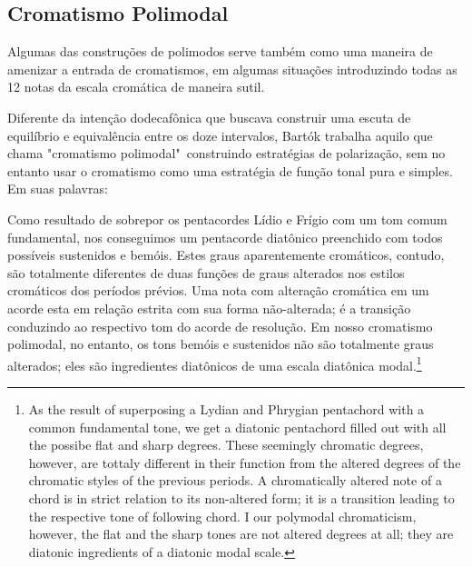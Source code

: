 \documentclass[
	12pt,				%
	openright,			%
	twoside,			%
	a4paper,			%
	english,			%
	french,				%
	spanish,			%
	brazil				%
	]{abntex2}
\begin{document}
\subsection{Cromatismo Polimodal}
\label{polimodal}

Algumas das construções de polimodos serve também como uma maneira de amenizar a entrada de cromatismos, em algumas situações introduzindo todas as 12 notas da escala cromática de maneira sutil. 

Diferente da intenção dodecafônica que buscava construir uma escuta de equilíbrio e equivalência entre os doze intervalos, Bartók trabalha aquilo que chama "cromatismo polimodal"\ construindo estratégias de polarização, sem no entanto usar o cromatismo como uma estratégia de função tonal pura e simples. Em suas palavras:

\begin{citacao}
Como resultado de sobrepor os pentacordes Lídio e Frígio com um tom comum fundamental, nos conseguimos um pentacorde diatônico preenchido com todos possíveis sustenidos e bemóis. Estes graus aparentemente cromáticos, contudo, são totalmente diferentes de duas funções de graus alterados nos estilos cromáticos dos períodos prévios. Uma nota com alteração cromática em um acorde esta em relação estrita com sua forma não-alterada; é a transição conduzindo ao respectivo tom do acorde de resolução. Em nosso cromatismo polimodal, no entanto, os tons bemóis e sustenidos não são totalmente graus alterados; eles são ingredientes diatônicos de uma escala diatônica modal.\cite[ p.367]{bartok1993bela}\footnote{As the result of superposing a Lydian and Phrygian pentachord with a common fundamental tone, we get a diatonic pentachord filled out with all the possibe flat and sharp degrees. These seemingly chromatic degrees, however, are tottaly different in their function from the altered degrees of the chromatic styles of the previous periods. A chromatically altered note of a chord is in strict relation to its non-altered form; it is a transition leading to the respective tone of following chord. I our polymodal chromaticism, however, the flat and the sharp tones are not altered degrees at all; they are diatonic ingredients of a diatonic modal scale.\cite[ p.367]{bartok1993bela}}
\end{citacao}
\end{document}
